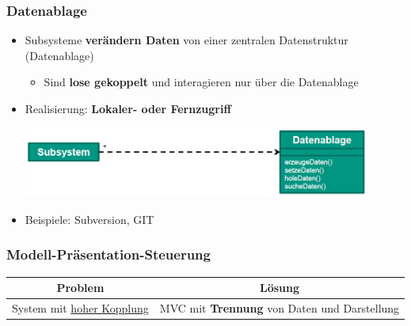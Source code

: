 		\subsubsection{Datenablage}
					
			\begin{itemize}
				\item Subsysteme \textbf{verändern Daten} von einer zentralen Datenstruktur (Datenablage)
				\begin{itemize}
					\item Sind \textbf{lose gekoppelt} und interagieren nur über die Datenablage
				\end{itemize}
				\item Realisierung: \textbf{Lokaler- oder Fernzugriff}
				\begin{center}
					\includegraphics[width=0.9\textwidth]{../resources/images/datenablage.png}
				\end{center}
				\item Beispiele: Subversion, GIT
			\end{itemize}
			
		\subsubsection{Modell-Präsentation-Steuerung}
					
			\begin{center}
				\begin{tabular}{c|c}
					\textbf{Problem}                      & \textbf{Lösung} \\
					\hline
					System mit \underline{hoher Kopplung} & MVC mit \textbf{Trennung} von Daten und Darstellung
				\end{tabular}
			\end{center}
						
